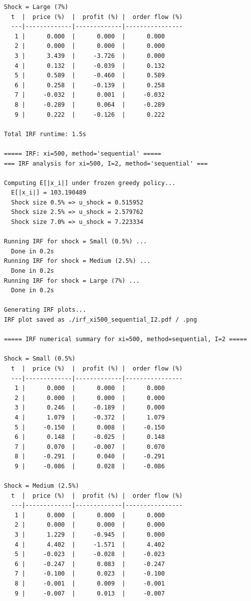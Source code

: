 \begin{lstlisting}[style=outputstyle]
Shock = Large (7%)
  t  |  price (%)  |  profit (%) |  order flow (%)
  ---|-------------|-------------|----------------
   1 |      0.000  |      0.000  |      0.000
   2 |      0.000  |      0.000  |      0.000
   3 |      3.439  |     -3.726  |      0.000
   4 |      0.132  |     -0.039  |      0.132
   5 |      0.589  |     -0.460  |      0.589
   6 |      0.258  |     -0.139  |      0.258
   7 |     -0.032  |      0.001  |     -0.032
   8 |     -0.289  |      0.064  |     -0.289
   9 |      0.222  |     -0.126  |      0.222

Total IRF runtime: 1.5s

===== IRF: xi=500, method='sequential' =====
=== IRF analysis for xi=500, I=2, method='sequential' ===

Computing E[|x_i|] under frozen greedy policy...
  E[|x_i|] = 103.190489
  Shock size 0.5% => u_shock = 0.515952
  Shock size 2.5% => u_shock = 2.579762
  Shock size 7.0% => u_shock = 7.223334

Running IRF for shock = Small (0.5%) ...
  Done in 0.2s
Running IRF for shock = Medium (2.5%) ...
  Done in 0.2s
Running IRF for shock = Large (7%) ...
  Done in 0.2s

Generating IRF plots...
IRF plot saved as ./irf_xi500_sequential_I2.pdf / .png

===== IRF numerical summary for xi=500, method=sequential, I=2 =====

Shock = Small (0.5%)
  t  |  price (%)  |  profit (%) |  order flow (%)
  ---|-------------|-------------|----------------
   1 |      0.000  |      0.000  |      0.000
   2 |      0.000  |      0.000  |      0.000
   3 |      0.246  |     -0.189  |      0.000
   4 |      1.079  |     -0.372  |      1.079
   5 |     -0.150  |      0.008  |     -0.150
   6 |      0.148  |     -0.025  |      0.148
   7 |      0.070  |     -0.007  |      0.070
   8 |     -0.291  |      0.040  |     -0.291
   9 |     -0.086  |      0.028  |     -0.086

Shock = Medium (2.5%)
  t  |  price (%)  |  profit (%) |  order flow (%)
  ---|-------------|-------------|----------------
   1 |      0.000  |      0.000  |      0.000
   2 |      0.000  |      0.000  |      0.000
   3 |      1.229  |     -0.945  |      0.000
   4 |      4.402  |     -1.571  |      4.402
   5 |     -0.023  |     -0.028  |     -0.023
   6 |     -0.247  |      0.083  |     -0.247
   7 |     -0.100  |      0.023  |     -0.100
   8 |     -0.001  |      0.009  |     -0.001
   9 |     -0.007  |      0.013  |     -0.007


\end{lstlisting}
